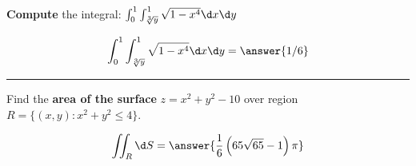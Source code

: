 \documentclass{ximera}
\begin{document}
\begin{problem}
  \textbf{Compute} the integral: $\int_0^1 \int_{\sqrt[3]{y}}^1 \sqrt{1-x^4}\d x \d y$
  \begin{prompt}
    \[
    \int_0^1 \int_{\sqrt[3]{y}}^1 \sqrt{1-x^4}\d x \d y = \answer{1/6}
    \]
  \end{prompt}
\end{problem}

\vfill

\hrule

\begin{problem}
  Find the \textbf{area of the surface} $z= x^2 + y^2 -10$ over region $R = \{(x,y):x^2+y^2\le 4 \}$.
  \begin{prompt}
    \[
    \iint_R \d S = \answer{\frac{1}{6} \left(65 \sqrt{65}-1\right) \pi}
    \]
  \end{prompt}  
\end{problem}
\vfill
\end{document}
